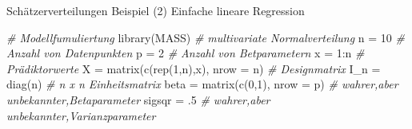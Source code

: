 \documentclass[
  8pt,
  ignorenonframetext,
]{beamer}
\newenvironment{Shaded}{\begin{snugshade}}{\end{snugshade}}
\newcommand{\AttributeTok}[1]{\textcolor[rgb]{0.77,0.63,0.00}{#1}}
\newcommand{\CommentTok}[1]{\textcolor[rgb]{0.56,0.35,0.01}{\textit{#1}}}
\newcommand{\DecValTok}[1]{\textcolor[rgb]{0.00,0.00,0.81}{#1}}
\newcommand{\FunctionTok}[1]{\textcolor[rgb]{0.00,0.00,0.00}{#1}}
\newcommand{\NormalTok}[1]{#1}
\newcommand{\OtherTok}[1]{\textcolor[rgb]{0.56,0.35,0.01}{#1}}
\newcommand{\SpecialCharTok}[1]{\textcolor[rgb]{0.00,0.00,0.00}{#1}}
\begin{document}
\begin{frame}[fragile]{Schätzerverteilungen}
\protect\hypertarget{schuxe4tzerverteilungen-6}{}
Beispiel (2) Einfache lineare Regression \vspace{2mm} \tiny

\begin{Shaded}
\begin{Highlighting}[]
\CommentTok{\# Modellfumuliertung}
\FunctionTok{library}\NormalTok{(MASS)                                          }\CommentTok{\# multivariate Normalverteilung}
\NormalTok{n          }\OtherTok{=} \DecValTok{10}                                        \CommentTok{\# Anzahl von Datenpunkten}
\NormalTok{p          }\OtherTok{=} \DecValTok{2}                                         \CommentTok{\# Anzahl von Betparametern}
\NormalTok{x          }\OtherTok{=} \DecValTok{1}\SpecialCharTok{:}\NormalTok{n                                       }\CommentTok{\# Prädiktorwerte}
\NormalTok{X          }\OtherTok{=} \FunctionTok{matrix}\NormalTok{(}\FunctionTok{c}\NormalTok{(}\FunctionTok{rep}\NormalTok{(}\DecValTok{1}\NormalTok{,n),x), }\AttributeTok{nrow =}\NormalTok{ n)           }\CommentTok{\# Designmatrix}
\NormalTok{I\_n        }\OtherTok{=} \FunctionTok{diag}\NormalTok{(n)                                   }\CommentTok{\# n x n Einheitsmatrix}
\NormalTok{beta       }\OtherTok{=} \FunctionTok{matrix}\NormalTok{(}\FunctionTok{c}\NormalTok{(}\DecValTok{0}\NormalTok{,}\DecValTok{1}\NormalTok{), }\AttributeTok{nrow =}\NormalTok{ p)                  }\CommentTok{\# wahrer,aber unbekannter,Betaparameter}
\NormalTok{sigsqr     }\OtherTok{=}\NormalTok{ .}\DecValTok{5}                                        \CommentTok{\# wahrer,aber unbekannter,Varianzparameter}


\end{Highlighting}
\end{Shaded}
\end{frame}
\end{document}
